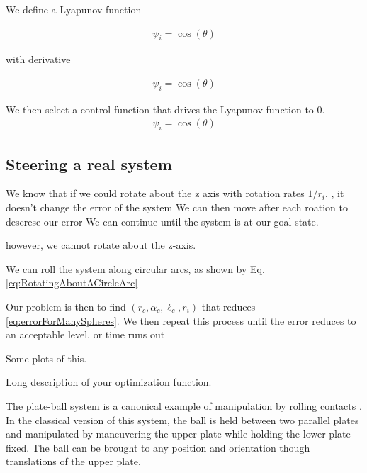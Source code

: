 \documentclass[letter paper, 10pt, conference]{ieeeconf}
\begin{document}
We define a Lyapunov function

\begin{align}
\psi_i = \cos( \theta) \label{eq:MultipleSphereLyapunov}
\end{align}

with derivative

\begin{align}
\psi_i = \cos( \theta) \label{eq:MultipleSphereLyapunovDerivative}
\end{align}

We then select a control function that drives the Lyapunov function to 0.
\begin{align}
\psi_i = \cos( \theta) \label{eq:ControlLyapunovFunction}
\end{align}

\subsection{Steering a real system}

We know that if we could rotate about the z axis with rotation rates $1/r_i$.  , it doesn't change the error of the system
We can then move after each roation to descrese our error 
We can continue until the system is at our goal state.
 
 
however, we cannot rotate about the z-axis.

We can roll the system along circular arcs, as shown by Eq. \eqref{eq:RotatingAboutACircleArc}


Our problem is then to find $(r_c, \alpha_c, \ell_c, r_i)  $ that reduces \eqref{eq:errorForManySpheres}.  We then repeat this process until the error reduces to an acceptable level, or time runs out


Some plots of this.


Long description of your optimization function.





The plate-ball system is a canonical example of manipulation by rolling contacts \cite{Brockett1993}. In the classical version of this system, the ball is held between two parallel plates and manipulated by maneuvering the upper plate while holding the lower plate fixed.  The ball can be brought to any position and orientation though translations of the upper plate.
\end{document}
